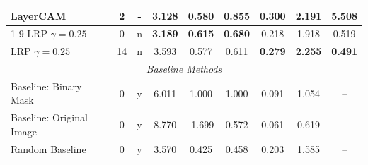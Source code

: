 \begin{longtable}{p{4cm}|cc|cccccc}
    LayerCAM & 2 & - & \textbf{3.128} & \textbf{0.580} & \textbf{0.855} & 0.300 & 2.191 & 5.508 \\
    \cmidrule(lr){1-9}
    LRP $\gamma=0.25$ & 0 & n & \textbf{3.189} & \textbf{0.615} & \textbf{0.680} & 0.218 & 1.918 & 0.519 \\
    LRP $\gamma=0.25$ & 14 & n & 3.593 & 0.577 & 0.611 & \textbf{0.279} & \textbf{2.255} & \textbf{0.491} \\
    \midrule
    \multicolumn{9}{c}{\textit{Baseline Methods}} \\
    \midrule
    Baseline: Binary Mask & 0 & y & 6.011 & 1.000 & 1.000 & 0.091 & 1.054 & -- \\
    Baseline: Original Image & 0 & y & 8.770 & -1.699 & 0.572 & 0.061 & 0.619 & -- \\
    Random Baseline & 0 & y & 3.570 & 0.425 & 0.458 & 0.203 & 1.585 & -- \\
    \midrule
\end{longtable}